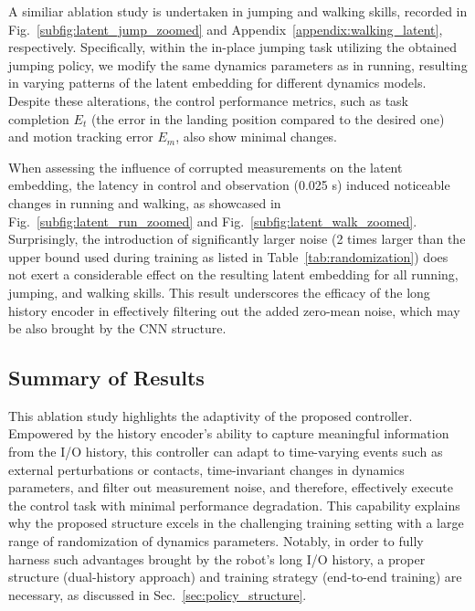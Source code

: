 A similiar ablation study is undertaken in jumping and walking skills, recorded in Fig.~\ref{subfig:latent_jump_zoomed} and Appendix~\ref{appendix:walking_latent}, respectively.
Specifically, within the in-place jumping task utilizing the obtained jumping policy, we modify the same dynamics parameters as in running, resulting in varying patterns of the latent embedding for different dynamics models.
Despite these alterations, the control performance metrics, such as task completion $E_t$ (the error in the landing position compared to the desired one) and motion tracking error $E_m$, also show minimal changes.

When assessing the influence of corrupted measurements on the latent embedding, the latency in control and observation (0.025 s) induced noticeable changes in running and walking, as showcased in Fig.~\ref{subfig:latent_run_zoomed} and Fig.~\ref{subfig:latent_walk_zoomed}. 
Surprisingly, the introduction of significantly larger noise (2 times larger than the upper bound used during training as listed in Table~\ref{tab:randomization}) does not exert a considerable effect on the resulting latent embedding for all running, jumping, and walking skills. 
This result underscores the efficacy of the long history encoder in effectively filtering out the added zero-mean noise, which may be also brought by the CNN structure. 

\subsection{Summary of Results}
This ablation study highlights the adaptivity of the proposed controller. 
Empowered by the history encoder's ability to capture meaningful information from the I/O history, this controller can adapt to time-varying events such as external perturbations or contacts, time-invariant changes in dynamics parameters, and filter out measurement noise, and therefore, effectively execute the control task with minimal performance degradation. 
This capability explains why the proposed structure excels in the challenging training setting with a large range of randomization of dynamics parameters.
Notably, in order to fully harness such advantages brought by the robot's long I/O history, a proper structure (dual-history approach) and training strategy (end-to-end training) are necessary, as discussed in Sec.~\ref{sec:policy_structure}.
